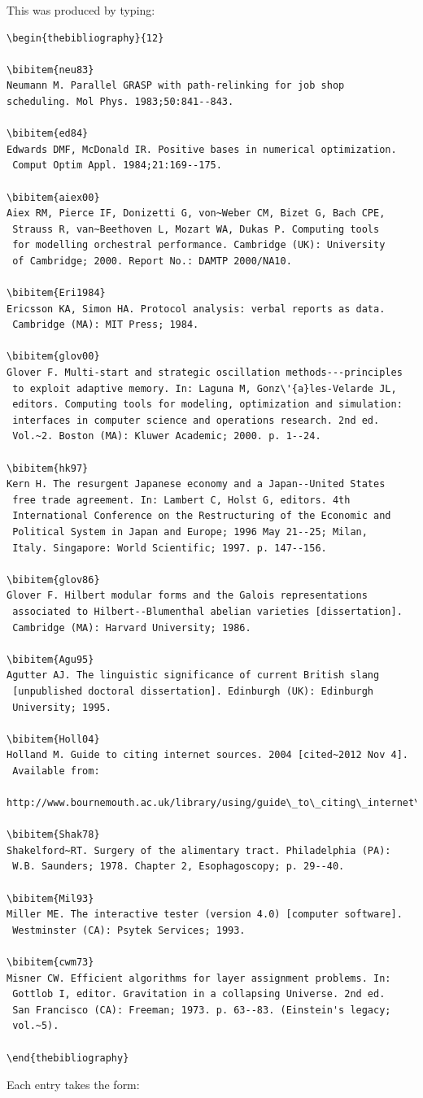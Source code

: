 \documentclass{gAPA2e}
\theoremstyle{plain}
\theoremstyle{remark}
\theoremstyle{definition}
\begin{document}
\bigskip
\noindent This was produced by typing:

\begin{verbatim}
\begin{thebibliography}{12}

\bibitem{neu83}
Neumann M. Parallel GRASP with path-relinking for job shop 
scheduling. Mol Phys. 1983;50:841--843.

\bibitem{ed84}
Edwards DMF, McDonald IR. Positive bases in numerical optimization.
 Comput Optim Appl. 1984;21:169--175.

\bibitem{aiex00}
Aiex RM, Pierce IF, Donizetti G, von~Weber CM, Bizet G, Bach CPE,
 Strauss R, van~Beethoven L, Mozart WA, Dukas P. Computing tools 
 for modelling orchestral performance. Cambridge (UK): University 
 of Cambridge; 2000. Report No.: DAMTP 2000/NA10.

\bibitem{Eri1984}
Ericsson KA, Simon HA. Protocol analysis: verbal reports as data.
 Cambridge (MA): MIT Press; 1984.

\bibitem{glov00}
Glover F. Multi-start and strategic oscillation methods---principles
 to exploit adaptive memory. In: Laguna M, Gonz\'{a}les-Velarde JL,
 editors. Computing tools for modeling, optimization and simulation:
 interfaces in computer science and operations research. 2nd ed.
 Vol.~2. Boston (MA): Kluwer Academic; 2000. p. 1--24.

\bibitem{hk97}
Kern H. The resurgent Japanese economy and a Japan--United States 
 free trade agreement. In: Lambert C, Holst G, editors. 4th 
 International Conference on the Restructuring of the Economic and 
 Political System in Japan and Europe; 1996 May 21--25; Milan, 
 Italy. Singapore: World Scientific; 1997. p. 147--156.

\bibitem{glov86}
Glover F. Hilbert modular forms and the Galois representations
 associated to Hilbert--Blumenthal abelian varieties [dissertation].
 Cambridge (MA): Harvard University; 1986.

\bibitem{Agu95}
Agutter AJ. The linguistic significance of current British slang
 [unpublished doctoral dissertation]. Edinburgh (UK): Edinburgh
 University; 1995.

\bibitem{Holl04}
Holland M. Guide to citing internet sources. 2004 [cited~2012 Nov 4].
 Available from:
 http://www.bournemouth.ac.uk/library/using/guide\_to\_citing\_internet\_sourc.html.

\bibitem{Shak78}
Shakelford~RT. Surgery of the alimentary tract. Philadelphia (PA):
 W.B. Saunders; 1978. Chapter 2, Esophagoscopy; p. 29--40.

\bibitem{Mil93}
Miller ME. The interactive tester (version 4.0) [computer software].
 Westminster (CA): Psytek Services; 1993.

\bibitem{cwm73}
Misner CW. Efficient algorithms for layer assignment problems. In:
 Gottlob I, editor. Gravitation in a collapsing Universe. 2nd ed. 
 San Francisco (CA): Freeman; 1973. p. 63--83. (Einstein's legacy; 
 vol.~5).

\end{thebibliography}
\end{verbatim}
\bigskip
\noindent Each entry takes the form:
\end{document}
